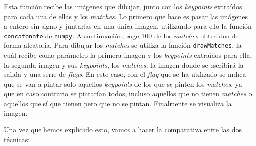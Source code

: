 \documentclass[11pt,a4paper]{article}
\begin{document}
Esta función recibe las imágenes que dibujar, junto con los \textit{keypoints} extraídos
para cada una de ellas y los \textit{matches}. Lo primero que hace es pasar las imágenes
a entero sin signo y juntarlas en una única imagen, utilizando para ello la función \texttt{concatenate}
de \texttt{numpy}.  A continuación, coge 100
de los \textit{matches} obtenidos de forma aleatoria. Para dibujar los \textit{matches}
se utiliza la función \texttt{drawMatches}, la cuál recibe como parámetro la primera
imagen y los \textit{keypoints} extraídos para ella, la segunda imagen y sus \textit{keypoints},
los \textit{matches}, la imagen donde se escribirá la salida y una serie de \textit{flags}. En este
caso, con el \textit{flag} que se ha utilizado se indica que se van a pintar solo aquellos \textit{keypoints}
de los que se pinten los \textit{matches}, ya que en caso contrario se pintarían todos, incluso aquellos
que no tienen \textit{matches} o aquellos que sí que tienen pero que no se pintan. Finalmente
se visualiza la imagen.

Una vez que hemos explicado esto, vamos a hacer la comparativa entre las dos técnicas:
\end{document}
